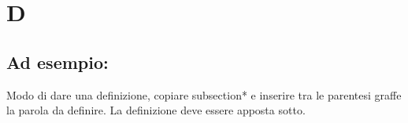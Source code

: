 \section*{D}
\markright{}
\subsection*{Ad esempio:}
Modo di dare una definizione, copiare subsection*{} e inserire tra le parentesi graffe la parola da definire. La definizione deve essere apposta sotto.
